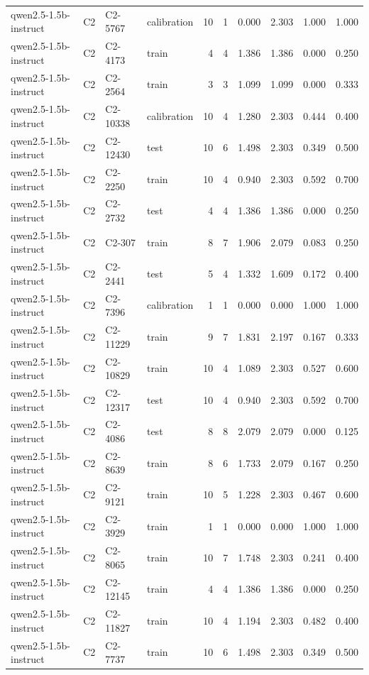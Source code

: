 \begin{table}
\begin{tabular}{llllrrrrrr}
qwen2.5-1.5b-instruct & C2 & C2-5767 & calibration & 10 & 1 & 0.000 & 2.303 & 1.000 & 1.000 \\
qwen2.5-1.5b-instruct & C2 & C2-4173 & train & 4 & 4 & 1.386 & 1.386 & 0.000 & 0.250 \\
qwen2.5-1.5b-instruct & C2 & C2-2564 & train & 3 & 3 & 1.099 & 1.099 & 0.000 & 0.333 \\
qwen2.5-1.5b-instruct & C2 & C2-10338 & calibration & 10 & 4 & 1.280 & 2.303 & 0.444 & 0.400 \\
qwen2.5-1.5b-instruct & C2 & C2-12430 & test & 10 & 6 & 1.498 & 2.303 & 0.349 & 0.500 \\
qwen2.5-1.5b-instruct & C2 & C2-2250 & train & 10 & 4 & 0.940 & 2.303 & 0.592 & 0.700 \\
qwen2.5-1.5b-instruct & C2 & C2-2732 & test & 4 & 4 & 1.386 & 1.386 & 0.000 & 0.250 \\
qwen2.5-1.5b-instruct & C2 & C2-307 & train & 8 & 7 & 1.906 & 2.079 & 0.083 & 0.250 \\
qwen2.5-1.5b-instruct & C2 & C2-2441 & test & 5 & 4 & 1.332 & 1.609 & 0.172 & 0.400 \\
qwen2.5-1.5b-instruct & C2 & C2-7396 & calibration & 1 & 1 & 0.000 & 0.000 & 1.000 & 1.000 \\
qwen2.5-1.5b-instruct & C2 & C2-11229 & train & 9 & 7 & 1.831 & 2.197 & 0.167 & 0.333 \\
qwen2.5-1.5b-instruct & C2 & C2-10829 & train & 10 & 4 & 1.089 & 2.303 & 0.527 & 0.600 \\
qwen2.5-1.5b-instruct & C2 & C2-12317 & test & 10 & 4 & 0.940 & 2.303 & 0.592 & 0.700 \\
qwen2.5-1.5b-instruct & C2 & C2-4086 & test & 8 & 8 & 2.079 & 2.079 & 0.000 & 0.125 \\
qwen2.5-1.5b-instruct & C2 & C2-8639 & train & 8 & 6 & 1.733 & 2.079 & 0.167 & 0.250 \\
qwen2.5-1.5b-instruct & C2 & C2-9121 & train & 10 & 5 & 1.228 & 2.303 & 0.467 & 0.600 \\
qwen2.5-1.5b-instruct & C2 & C2-3929 & train & 1 & 1 & 0.000 & 0.000 & 1.000 & 1.000 \\
qwen2.5-1.5b-instruct & C2 & C2-8065 & train & 10 & 7 & 1.748 & 2.303 & 0.241 & 0.400 \\
qwen2.5-1.5b-instruct & C2 & C2-12145 & train & 4 & 4 & 1.386 & 1.386 & 0.000 & 0.250 \\
qwen2.5-1.5b-instruct & C2 & C2-11827 & train & 10 & 4 & 1.194 & 2.303 & 0.482 & 0.400 \\
qwen2.5-1.5b-instruct & C2 & C2-7737 & train & 10 & 6 & 1.498 & 2.303 & 0.349 & 0.500 \\

\end{tabular}
\end{table}
